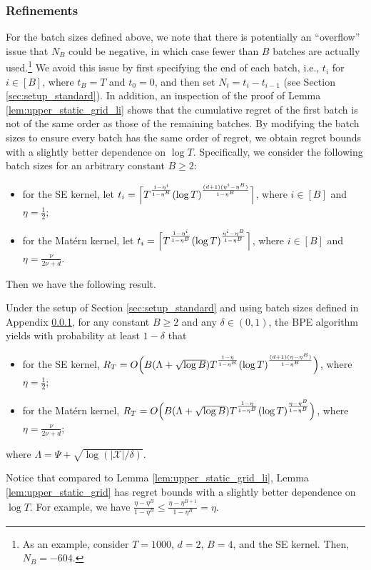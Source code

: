 \documentclass[10pt]{article}
\begin{document}
\subsubsection{Refinements}
\label{app:fixed_B_refinements}
For the batch sizes defined above, we note that there is potentially an ``overflow'' issue that 
$N_B$ could be negative, 
in which case fewer than $B$ batches are actually used.\footnote{As an example, consider $T=1000$, $d=2$, $B=4$, and the SE kernel. Then, $N_B=-604$.}
We avoid this issue by first specifying the end of each batch, i.e., $t_i$ for $i\in[B]$, where $t_B=T$ and $t_0=0$, and then set $N_i = t_i-t_{i-1}$ (see Section \ref{sec:setup_standard}).
In addition, an inspection of the proof of Lemma \ref{lem:upper_static_grid_li} shows that the cumulative regret of the first batch is not of the same order as those of the remaining batches. By modifying the batch sizes to ensure every batch has the same order of regret, we obtain regret bounds with a slightly better dependence on $\log T$. 
Specifically, we consider the following batch sizes for an arbitrary constant $B\geq 2$:
\begin{itemize}
    \item for the SE kernel, let $t_i = \Bigl\lceil T^{\frac{1-\eta^i}{1-\eta^B}}(\log T)^{\frac{(d+1)(\eta^i- \eta^B)}{1-\eta^B}}\Bigr\rceil$, where $i\in[B]$ and $\eta=\frac{1}{2}$;
    \item for the Mat\'ern kernel, let $t_i = \Bigl\lceil T^{\frac{1-\eta^i}{1-\eta^B}}(\log T)^{\frac{\eta^i- \eta^B}{1-\eta^B}}\Bigr\rceil$, where $i\in[B]$ and $\eta=\frac{\nu}{2\nu+d}$.
\end{itemize}
Then we have the following result.
\begin{lemma}
    \label{lem:upper_static_grid}
    Under the setup of Section \ref{sec:setup_standard} and using batch sizes defined in Appendix \ref{app:fixed_B_refinements},
    for any constant $B\geq 2$ and any $\delta \in (0,1)$,
    the BPE algorithm yields with probability at least $1-\delta$ that
    \begin{itemize}
        \item for the SE kernel, $R_T = O \Bigl( B(\Lambda+\sqrt{\log B}) T^{\frac{1-\eta}{1-\eta^B}} (\log T)^{\frac{(d+1)(\eta-\eta^B)}{1-\eta^B}}\Bigr)$, where $\eta=\frac{1}{2}$;
        \item for the Mat\'ern kernel, $R_T = O \Bigl( B(\Lambda+\sqrt{\log B}) T^{\frac{1-\eta}{1-\eta^B}} (\log T)^{\frac{\eta-\eta^B}{1-\eta^B}}\Bigr)$, where $\eta = \frac{\nu}{2\nu+d}$;
    \end{itemize}
    where $\Lambda=\Psi+\sqrt{\log(|\mathcal{X}|/\delta)}$.
\end{lemma}
Notice that compared to Lemma \ref{lem:upper_static_grid_li}, Lemma \ref{lem:upper_static_grid} has regret bounds with a slightly better dependence on $\log T$. For example, we have $\frac{\eta-\eta^B}{1-\eta^B} \leq \frac{\eta-\eta^{B+1}}{1-\eta^B} = \eta $.
\end{document}
